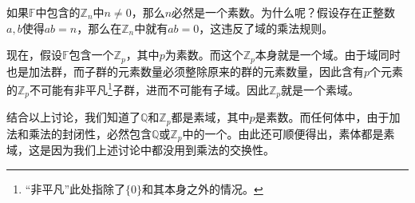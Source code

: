 如果$\mathbb{F}$中包含的$\mathbb{Z}_n$中$n\neq 0$，那么$n$必然是一个素数。为什么呢？假设存在正整数$a, b$使得$ab=n$，那么在$\mathbb{Z}_n$中就有$ab=0$，这违反了域的乘法规则。

现在，假设$\mathbb{F}$包含一个$\mathbb{Z}_p$，其中$p$为素数。而这个$\mathbb{Z}_p$本身就是一个域。由于域同时也是加法群，而子群的元素数量必须整除原来的群的元素数量，因此含有$p$个元素的$\mathbb{Z}_p$不可能有非平凡\footnote{“非平凡”此处指除了$\{0\}$和其本身之外的情况。}子群，进而不可能有子域。因此$\mathbb{Z}_p$就是一个素域。

结合以上讨论，我们知道了$\mathbb{Q}$和$\mathbb{Z}_p$都是素域，其中$p$是素数。而任何体中，由于加法和乘法的封闭性，必然包含$\mathbb{Q}$或$\mathbb{Z}_p$中的一个。由此还可顺便得出，素体都是素域，这是因为我们上述讨论中都没用到乘法的交换性。












